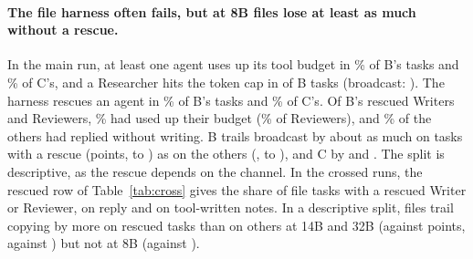 \documentclass[sigplan,10pt,nonacm,review,anonymous]{acmart}
\begin{document}
\paragraph{The file harness often fails, but at 8B files lose at least as much without a rescue.} In the main run, at least one agent uses up its tool budget in
\nRTwelveBudgetB{}\% of B's tasks and \nRTwelveBudgetC{}\% of C's, and a Researcher hits the token cap in
\nRTwelveCapB of \nRTwelveCapBN B tasks (broadcast: \nRTwelveCapAOne). The harness rescues an
agent in \nRThirteenMainRescB{}\% of B's tasks and \nRThirteenMainRescC{}\% of C's. Of B's rescued Writers and
Reviewers, \nRThirteenMainBudgetShareB{}\% had used up their budget (\nRThirteenMainRevBudgetShareB{}\% of
Reviewers), and \nRFourteenRescRepliedShare{}\% of the others had replied without writing. B trails broadcast by about as much on tasks
with a rescue (\nRThirteenMainRescGapB points, \nRThirteenMainRescGapBLo to \nRThirteenMainRescGapBHi) as on
the others (\nRThirteenMainKeptGapB, \nRThirteenMainKeptGapBLo to \nRThirteenMainKeptGapBHi), and C by
\nRThirteenMainRescGapC and \nRThirteenMainKeptGapC. The split is descriptive, as the rescue depends
on the channel. In the crossed runs, the rescued row of Table~\ref{tab:cross} gives the share of file tasks
with a rescued Writer or Reviewer, on reply and on tool-written notes. In a descriptive split, files trail copying by more on
rescued tasks than on others at 14B and 32B (\nRTwelveFourteenFileToolResc against
\nRTwelveFourteenFileToolKept points, \nRTwelveThirtyTwoFileToolResc against \nRTwelveThirtyTwoFileToolKept)
but not at 8B (\nRTwelveEightFileToolResc against \nRTwelveEightFileToolKept).
\end{document}
